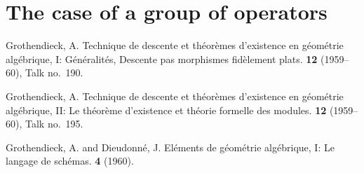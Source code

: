 \documentclass{article}
\begin{document}
\section{The case of a group of operators}
\label{3}






\nocite{*}
\begin{thebibliography}{3}

  {\sc Grothendieck, A.}
  \newblock Technique de descente et th\'{e}or\`{e}mes d'existence en g\'{e}om\'{e}trie alg\'{e}brique, I: G\'{e}n\'{e}ralit\'{e}s, Descente pas morphismes fid\`{e}lement plats.
   \textbf{12} (1959--60), Talk no.~190.

  {\sc Grothendieck, A.}
  \newblock Technique de descente et th\'{e}or\`{e}mes d'existence en g\'{e}om\'{e}trie alg\'{e}brique, II: Le th\'{e}or\`{e}me d'existence et th\'{e}orie formelle des modules.
   \textbf{12} (1959--60), Talk no.~195.

  {\sc Grothendieck, A. and Dieudonn\'{e}, J.}
  \newblock El\'{e}ments de g\'{e}om\'{e}trie alg\'{e}brique, I: Le langage de sch\'{e}mas.
   \textbf{4} (1960).

\end{thebibliography}
\end{document}
